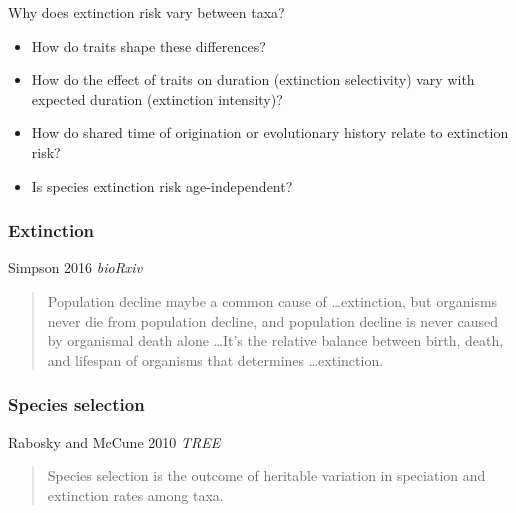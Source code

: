 \documentclass{beamer}
\begin{document}
\begin{frame}
  \begin{alertblock}{Why does extinction risk vary between taxa?}
    \begin{itemize}
      \item How do traits shape these differences?
      \item How do the effect of traits on duration (\alert{extinction selectivity}) vary with expected duration (\alert{extinction intensity})?
      \item How do shared time of origination or evolutionary history relate to extinction risk?
      \item Is species extinction risk age-independent?
    \end{itemize}
  \end{alertblock}
\end{frame}


\begin{frame}
  \frametitle{Extinction}
  \begin{block}{Simpson 2016 \em{bioRxiv}}
    \begin{quote}
      Population decline maybe a common cause of \dots extinction, but organisms never die from population decline, and population decline is never caused by organismal death alone \dots It's the relative balance between birth, death, and lifespan of organisms that determines \dots extinction. 
    \end{quote}
  \end{block}
\end{frame}

\begin{frame}
  \frametitle{Species selection}

  \begin{block}{Rabosky and McCune 2010 \em{TREE}}
    \begin{quote}
      Species selection is the outcome of heritable variation in speciation and extinction rates among taxa.
    \end{quote}
  \end{block}

\end{frame}
\end{document}
